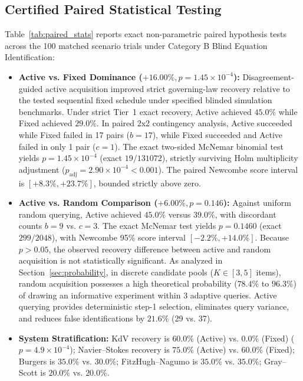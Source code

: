 \documentclass[twocolumn,10pt,a4paper]{article}
\begin{document}
\subsection{Certified Paired Statistical Testing}
Table~\ref{tab:paired_stats} reports exact non-parametric paired hypothesis tests across the 100 matched scenario trials under Category B Blind Equation Identification:
\begin{itemize}
    \item \textbf{Active vs. Fixed Dominance ($+16.00\%, p = 1.45 \times 10^{-4}$):} Disagreement-guided active acquisition improved strict governing-law recovery relative to the tested sequential fixed schedule under specified blinded simulation benchmarks. Under strict Tier~1 exact recovery, Active achieved $45.0\%$ while Fixed achieved $29.0\%$. In paired 2x2 contingency analysis, Active succeeded while Fixed failed in 17 pairs ($b=17$), while Fixed succeeded and Active failed in only 1 pair ($c=1$). The exact two-sided McNemar binomial test yields $p = 1.45 \times 10^{-4}$ (exact $19/131072$), strictly surviving Holm multiplicity adjustment ($p_{\text{adj}} = 2.90 \times 10^{-4} < 0.001$). The paired Newcombe score interval is $[+8.3\%, +23.7\%]$, bounded strictly above zero.
    \item \textbf{Active vs. Random Comparison ($+6.00\%, p = 0.146$):} Against uniform random querying, Active achieved $45.0\%$ versus $39.0\%$, with discordant counts $b=9$ vs. $c=3$. The exact McNemar test yields $p = 0.1460$ (exact $299/2048$), with Newcombe 95\% score interval $[-2.2\%, +14.0\%]$. Because $p > 0.05$, the observed recovery difference between active and random acquisition is not statistically significant. As analyzed in Section~\ref{sec:probability}, in discrete candidate pools ($K \in [3, 5]$ items), random acquisition possesses a high theoretical probability ($78.4\%$ to $96.3\%$) of drawing an informative experiment within 3 adaptive queries. Active querying provides deterministic step-1 selection, eliminates query variance, and reduces false identifications by $21.6\%$ (29 vs. 37).
    \item \textbf{System Stratification:} KdV recovery is $60.0\%$ (Active) vs. $0.0\%$ (Fixed) ($p = 4.9 \times 10^{-4}$); Navier--Stokes recovery is $75.0\%$ (Active) vs. $60.0\%$ (Fixed); Burgers is $35.0\%$ vs. $30.0\%$; FitzHugh--Nagumo is $35.0\%$ vs. $35.0\%$; Gray--Scott is $20.0\%$ vs. $20.0\%$.
\end{itemize}
\end{document}
